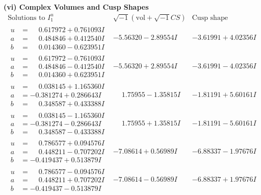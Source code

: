 \documentclass[1p]{elsarticle_modified}
\theoremstyle{definition}
\newcommand{\I}{\sqrt{-1}}
\begin{document}
\newpage\flushleft \textbf{(vi) Complex Volumes and Cusp Shapes}
$$\begin{array}{c|c|c}  
\text{Solutions to }I^u_{1}& \I (\text{vol} + \sqrt{-1}CS) & \text{Cusp shape}\\
 \hline 
\begin{aligned}
u &= \phantom{-}0.617972 + 0.761093 I \\
a &= \phantom{-}0.484846 + 0.412540 I \\
b &= \phantom{-}0.014360 - 0.623951 I\end{aligned}
 & -5.56320 - 2.89554 I & -3.61991 + 4.02356 I \\ \hline\begin{aligned}
u &= \phantom{-}0.617972 - 0.761093 I \\
a &= \phantom{-}0.484846 - 0.412540 I \\
b &= \phantom{-}0.014360 + 0.623951 I\end{aligned}
 & -5.56320 + 2.89554 I & -3.61991 - 4.02356 I \\ \hline\begin{aligned}
u &= \phantom{-}0.038145 + 1.165360 I \\
a &= -0.381274 + 0.286643 I \\
b &= \phantom{-}0.348587 + 0.433388 I\end{aligned}
 & \phantom{-}1.75955 - 1.35815 I & -1.81191 + 5.60161 I \\ \hline\begin{aligned}
u &= \phantom{-}0.038145 - 1.165360 I \\
a &= -0.381274 - 0.286643 I \\
b &= \phantom{-}0.348587 - 0.433388 I\end{aligned}
 & \phantom{-}1.75955 + 1.35815 I & -1.81191 - 5.60161 I \\ \hline\begin{aligned}
u &= \phantom{-}0.786577 + 0.094576 I \\
a &= \phantom{-}0.448211 - 0.707202 I \\
b &= -0.419437 + 0.513879 I\end{aligned}
 & -7.08614 + 0.56989 I & -6.88337 - 1.97676 I \\ \hline\begin{aligned}
u &= \phantom{-}0.786577 - 0.094576 I \\
a &= \phantom{-}0.448211 + 0.707202 I \\
b &= -0.419437 - 0.513879 I\end{aligned}
 & -7.08614 - 0.56989 I & -6.88337 + 1.97676 I \\ \hline\begin{aligned}

\end{aligned}
\end{array}$$
\end{document}
